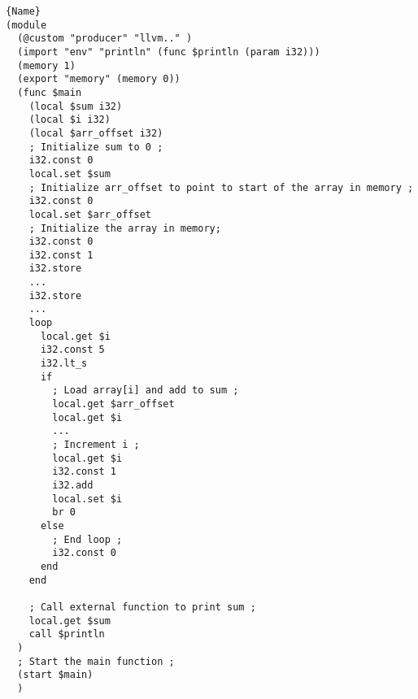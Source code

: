 
{
    \begin{lstlisting}[label=example:wasmprogram,caption={Simplified WebAssembly code for the program of \autoref{example:cprogram}.}, captionpos=b]{Name}
(module
  (@custom "producer" "llvm.." )
  (import "env" "println" (func $println (param i32)))
  (memory 1)
  (export "memory" (memory 0))
  (func $main
    (local $sum i32)
    (local $i i32)
    (local $arr_offset i32)
    ; Initialize sum to 0 ;
    i32.const 0
    local.set $sum
    ; Initialize arr_offset to point to start of the array in memory ;
    i32.const 0
    local.set $arr_offset
    ; Initialize the array in memory;
    i32.const 0
    i32.const 1
    i32.store
    ...
    i32.store
    ...
    loop
      local.get $i
      i32.const 5
      i32.lt_s
      if
        ; Load array[i] and add to sum ;
        local.get $arr_offset
        local.get $i
        ...
        ; Increment i ;
        local.get $i
        i32.const 1
        i32.add
        local.set $i
        br 0
      else
        ; End loop ;
        i32.const 0
      end
    end
    
    ; Call external function to print sum ;
    local.get $sum
    call $println
  )
  ; Start the main function ;
  (start $main)
  )
\end{lstlisting}
}
